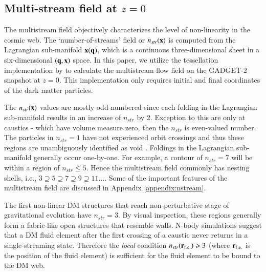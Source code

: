 \subsection{Multi-stream field at $z=0$}
\label{sec:multiCalc}


The multistream field objectively characterizes the level of non-linearity in the cosmic web. The `number-of-streams' field or $n_{str}({\bf x})$ is computed from the Lagrangian sub-manifold ${\bf x}({\bf q})$, which is a continuous three-dimensional sheet in a six-dimensional  $({\bf q}, {\bf x})$ space. In this paper, we utilize the tessellation implementation by \cite{Shandarin2012} to calculate the multistream flow field on the GADGET-2 snapshot at $z=0$. This implementation only requires initial and final coordinates of the dark matter particles. 

The $n_{str}(\bf{x})$ values are mostly odd-numbered since each folding in the Lagrangian sub-manifold results in an increase of $n_{str}$ by 2. Exception to this are only at caustics - which have volume measure zero, then the $n_{str}$ is even-valued number. The particles in $n_{str} = 1$ have not experienced orbit crossings and thus these regions are unambiguously identified as void \citep{Shandarin2012}. Foldings in the Lagrangian sub-manifold generally occur one-by-one. For example, a contour of $n_{str} = 7$ will be within a region of $n_{str} \leq 5$. Hence the multistream field commonly has nesting shells, i.e., $ 3 \supseteq  5 \supseteq  7 \supseteq  9 \supseteq  11 \ldots$. Some of the important features of the multistream field are discussed in Appendix \ref{appendix:nstream}.  

The first non-linear DM structures that reach non-perturbative stage of gravitational evolution have $n_{str} = 3$. By visual inspection, these regions generally form a fabric-like open structures that resemble walls. N-body simulations suggest that a DM fluid element after the first 
crossing of a caustic never returns in  a single-streaming state. Therefore the {\it local} condition $n_{str}({\bf r}_{\rm f.e.}) \geq 3$
(where  ${\bf r}_{\rm f.e.}$ is the position of the fluid element) is  sufficient for the fluid element to be bound to the DM web.

